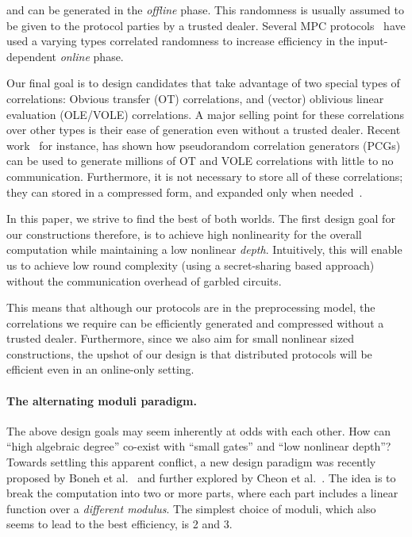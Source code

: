     and can be generated in the \textit{offline} phase. This randomness is usually assumed to be given to the protocol parties by a trusted dealer. Several MPC protocols~\cite{?} have used a varying types correlated randomness to increase efficiency in the input-dependent \textit{online} phase.

    \hspace*{1em} Our final goal is to design candidates that take advantage of two special types of correlations: Obvious transfer (OT) correlations, and (vector) oblivious linear evaluation (OLE/VOLE) correlations. A major selling point for these correlations over other types is their ease of generation even without a trusted dealer. Recent work~\cite{?} for instance, has shown how pseudorandom correlation generators (PCGs) can be used to generate millions of OT and VOLE correlations with little to no communication. Furthermore, it is not necessary to store all of these correlations; they can stored in a compressed form, and expanded only when needed~\cite{?}.


    \hspace*{1em} In this paper, we strive to find the best of both worlds. The first design goal for our constructions therefore, is to achieve high nonlinearity for the overall computation while maintaining a low nonlinear \textit{depth}. Intuitively, this will enable us to achieve low round complexity (using a secret-sharing based approach) without the communication overhead of garbled circuits.

    \hspace*{1em} This means that although our protocols are in the preprocessing model, the correlations we require can be efficiently generated and compressed without a trusted dealer. Furthermore, since we also aim for small nonlinear sized constructions, the upshot of our design is that distributed protocols will be efficient even in an online-only setting.
\fi

\paragraph{\bf The alternating moduli paradigm.} The above design goals may seem inherently at odds with each other. How can ``high algebraic degree'' co-exist with ``small gates'' and ``low nonlinear depth''? Towards settling this apparent conflict, a new design paradigm was recently proposed by Boneh et al.~\cite{boneh2018-darkmatter} and further explored by Cheon et al.~\cite{cheon2020-adventures}. The idea is to break the computation into two or more parts, where each part includes a linear function over a {\em different modulus}. The simplest choice of moduli, which also seems to lead to the best efficiency, is 2 and 3.

